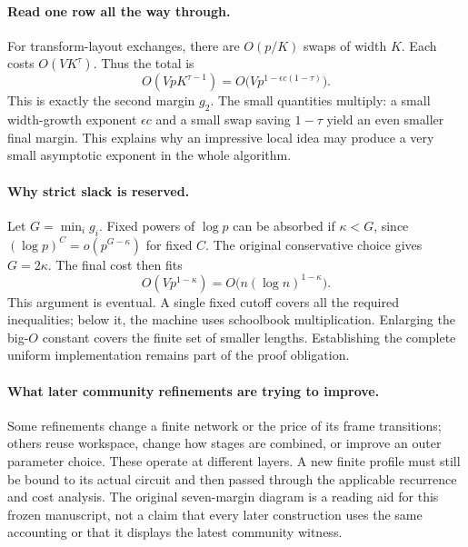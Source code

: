 
\paragraph{Read one row all the way through.}
For transform-layout exchanges, there are $O(p/K)$ swaps of width $K$.
Each costs $O(VK^\tau)$. Thus the total is
\[
 O(VpK^{\tau-1})
 =O\bigl(Vp^{1-\epsilon c(1-\tau)}\bigr).
\]
This is exactly the second margin $g_2$. The small quantities multiply:
a small width-growth exponent $\epsilon c$ and a small swap saving
$1-\tau$ yield an even smaller final margin. This explains why an impressive
local idea may produce a very small asymptotic exponent in the whole algorithm.

\paragraph{Why strict slack is reserved.}
Let $G=\min_i g_i$. Fixed powers of $\log p$ can be absorbed if
$\kappa<G$, since $(\log p)^C=o(p^{G-\kappa})$ for fixed $C$.
The original conservative choice gives $G=2\kappa$. The final cost then fits
\[
 O(Vp^{1-\kappa})=O\bigl(n(\log n)^{1-\kappa}\bigr).
\]
This argument is eventual. A single fixed cutoff covers all the required
inequalities; below it, the machine uses schoolbook multiplication. Enlarging
the big-$O$ constant covers the finite set of smaller lengths. Establishing
the complete uniform implementation remains part of the proof obligation.

\paragraph{What later community refinements are trying to improve.}
Some refinements change a finite network or the price of its frame transitions;
others reuse workspace, change how stages are combined, or improve an outer
parameter choice. These operate at different layers. A new finite profile
must still be bound to its actual circuit and then passed through the applicable
recurrence and cost analysis. The original seven-margin diagram is a reading
aid for this frozen manuscript, not a claim that every later construction uses
the same accounting or that it displays the latest community witness.


